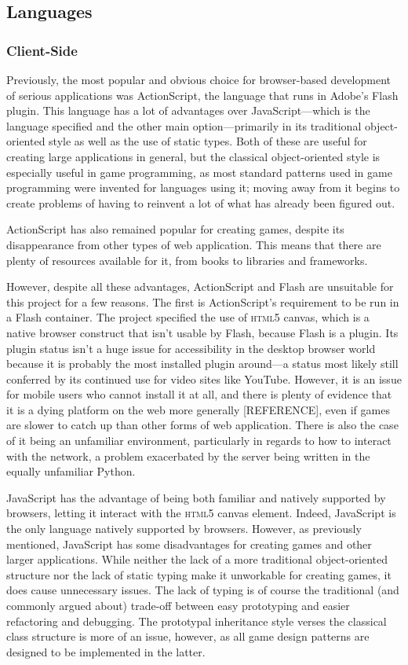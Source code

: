 \subsection{Languages}
\subsubsection{Client-Side}
Previously, the most popular and obvious choice for browser-based development of serious applications was ActionScript, the language that runs in Adobe's Flash plugin. This language has a lot of advantages over JavaScript---which is the language specified and the other main option---primarily in its traditional object-oriented style as well as the use of static types. Both of these are useful for creating large applications in general, but the classical object-oriented style is especially useful in game programming, as most standard patterns used in game programming were invented for languages using it; moving away from it begins to create problems of having to reinvent a lot of what has already been figured out.

ActionScript has also remained popular for creating games, despite its disappearance from other types of web application. This means that there are plenty of resources available for it, from books to libraries and frameworks.

However, despite all these advantages, ActionScript and Flash are unsuitable for this project for a few reasons. The first is ActionScript's requirement to be run in a Flash container. The project specified the use of \textsc{html5} canvas, which is a native browser construct that isn't usable by Flash, because Flash is a plugin. Its plugin status isn't a huge issue for accessibility in the desktop browser world because it is probably the most installed plugin around---a status most likely still conferred by its continued use for video sites like YouTube. However, it is an issue for mobile users who cannot install it at all, and there is plenty of evidence that it is a dying platform on the web more generally [REFERENCE], even if games are slower to catch up than other forms of web application. There is also the case of it being an unfamiliar environment, particularly in regards to how to interact with the network, a problem exacerbated by the server being written in the equally unfamiliar Python.

JavaScript has the advantage of being both familiar and natively supported by browsers, letting it interact with the \textsc{html5} canvas element. Indeed, JavaScript is the only language natively supported by browsers. However, as previously mentioned, JavaScript has some disadvantages for creating games and other larger applications. While neither the lack of a more traditional object-oriented structure nor the lack of static typing make it unworkable for creating games, it does cause unnecessary issues. The lack of typing is of course the traditional (and commonly argued about) trade-off between easy prototyping and easier refactoring and debugging. The prototypal inheritance style verses the classical class structure is more of an issue, however, as all game design patterns are designed to be implemented in the latter.

